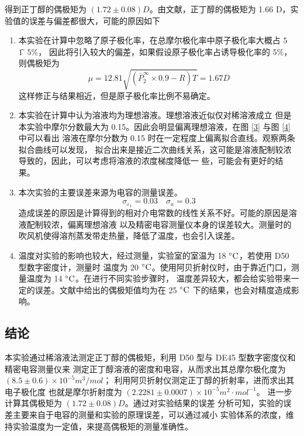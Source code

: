 \documentclass[cn,hazy,pku,12pt,normal,math=newtx,cite=super]{elegantnote}
\begin{document}
得到正丁醇的偶极矩为 $(1.72 \pm 0.08) D$。由文献\cite{CRC}，正丁醇的偶极矩为 1.66 D，实验值的误差与偏差都很大，可能的原因如下
\begin{enumerate}
    \item 本实验在计算中忽略了原子极化率，在总摩尔极化率中原子极化率大概占 $5$ ~ $1̃5\%$，
    因此将引入较大的偏差，如果假设原子极化率占诱导极化率的 $5\%$，则偶极矩为
    $$
        \mu = 12.81\sqrt{(\bar{P}_2^\infty\times 0.9 - R)T} = 1.67 D
    $$
    这样修正与结果相近，但是原子极化率比例不易确定。
    \item 本实验在计算中认为溶液均为理想溶液。理想溶液近似仅对稀溶液成立
    但是本实验中摩尔分数最大为 0.15。因此会明显偏离理想溶液，在图 \ref{3} 与图 \ref{4} 中可以看出
    溶液在摩尔分数为 0.15 时在一定程度上偏离拟合直线。观察两条拟合曲线可以发现，
    拟合出来是接近二次曲线关系，这可能是溶液配制较浓导致的，因此，可以考虑将溶液的浓度梯度降低一
    些，可能会有更好的结果。
    \item 本次实验的主要误差来源为电容的测量误差。
    $$
    \sigma_{\varepsilon_1} = 0.03 \quad \sigma_a =  0.3
    $$
    造成误差的原因是计算得到的相对介电常数的线性关系不好。可能的原因是溶液配制较浓，偏离理想溶液
    以及精密电容测量仪本身的误差较大。测量时的吹风机使得溶剂蒸发带走热量，降低了温度，也会引入误差。
    \item 温度对实验的影响也较大，经过测量，实验室的室温为 18 $\rm \degree C$，若使用 D50 型数字密度计，测量时
    温度为 20 $\rm \degree C$。使用阿贝折射仪时，由于靠近门口，测量温度为 14 $\rm \degree C$。在进行不同实验步骤时，
    温度差异较大，都会给实验带来一定的误差。文献中给出的偶极矩值均为在 25 $\rm \degree C$ 下的结果，也会对精度造成影响。    
\end{enumerate}

\subsection{结论}

本实验通过稀溶液法测定正丁醇的偶极矩，利用 D50 型与 DE45 型数字密度仪和精密电容测量仪来
测定正丁醇溶液的密度和电容，从而求出其总摩尔极化度为 $(8.5 \pm 0.6) \times 10^{-5}m^3/mol$；
利用阿贝折射仪测定正丁醇的折射率，进而求出其电子极化度
也就是摩尔折射度为 $(2.2281 \pm 0.0007) \times 10^{-5} m^2\cdot mol^{-1}$。
进一步计算其偶极矩为 $(1.72 \pm 0.08) D$。通过对实验结果的误差
分析可知，实验的误差主要来自于电容的测量和实验的原理误差，可以通过减小
实验体系的浓度，维持实验温度为一定值，来提高偶极矩的测量准确性。

\newpage
\end{document}
